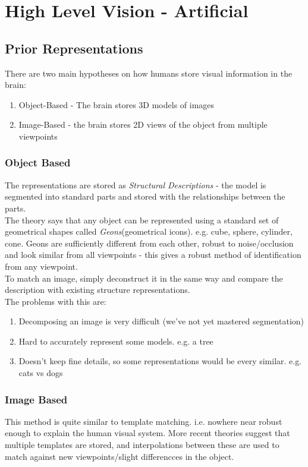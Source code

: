 \section{High Level Vision - Artificial}

\subsection{Prior Representations}
There are two main hypotheses on how humans store visual information in the brain:
\begin{enumerate}
    \item Object-Based - The brain stores 3D models of images
    \item Image-Based - the brain stores 2D views of the object from multiple viewpoints
\end{enumerate}

\subsubsection{Object Based}
The representations are stored as \emph{Structural Descriptions} - the model is segmented into standard parts and stored with the relationships between the parts. \\

The theory says that any object can be represented using a standard set of geometrical shapes called \emph{Geons}(geometrical icons). e.g. cube, sphere, cylinder, cone. Geons are sufficiently different from each other, robust to noise/occlusion and look similar from all viewpoints - this gives a robust method of identification from any viewpoint.\\

To match an image, simply deconstruct it in the same way and compare the description with existing structure representations.\\

The problems with this are:
\begin{enumerate}
    \item Decomposing an image is very difficult (we've not yet mastered segmentation)
    \item Hard to accurately represent some models. e.g. a tree
    \item Doesn't keep fine details, so some representations would be every similar. e.g. cats vs dogs 
\end{enumerate}

\subsubsection{Image Based}
This method is quite similar to template matching. i.e. nowhere near robust enough to explain the human visual system. More recent theories suggest that multiple templates are stored, and interpolations between these are used to match against new viewpoints/slight differencces in the object.

